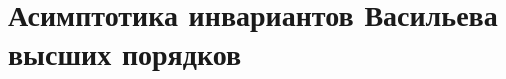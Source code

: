 \documentclass[12pt, a4paper, titlepage]{article}
\newcommand{\startvec}{\begin{pmatrix}
                        1\\0
                       \end{pmatrix}}
\begin{document}
\newtheorem{theorem}{Теорема}
\newtheorem{statement}{Утверждение}
\newtheorem{proposition}{Предложение}
\newtheorem{definition}{Определение}
\newtheorem{lem}{Лемма}
\newtheorem{example}{Пример}
\newtheorem{remark}{Замечание}

\section{Асимптотика инвариантов Васильева высших порядков}
\begin{comment}
Пусть $Z_t, t \ge 1$ --- двумерное броуновское движение, выходящее из точки $\startvec$:
$$Z(1)=\startvec.$$
Введём, следуя~\cite{BertoinWerner}, процесс $X_t$ с помощью экспоненциальной замены времени
для $Z_t$:
$$X(t)=e^{-t/2}Z(e^t), t \ge 0.$$
Тогда $X(t)$ --- двумерный процесс Орнштейна-Уленбека. \\
Пусть $R(t)=|X(t)|, H(t)=\int\limits_0^t \frac{ds}{R_s^2}.$
\end{comment}

\begin{comment}
Можно показать, что конечномерные распределения процесса
$\frac{H(tT)}{T^2}$ сходятся при $T\to\infty$ к конечномерным
распределениям процесса $S,$
где \\
$$S(t)=\int\limits_0^{\sigma(t)}\mathbbm{1}_{w_s \le 0}ds, t \ge 0,$$
$w$ --- одномерное броуновское движение с $w(0)=0,$ \\
$l_t$ --- локальное время $w$ в нуле, \\
$\sigma(t)=\inf\{s > 0: l_s >t\}.$
\end{comment}
\end{document}
